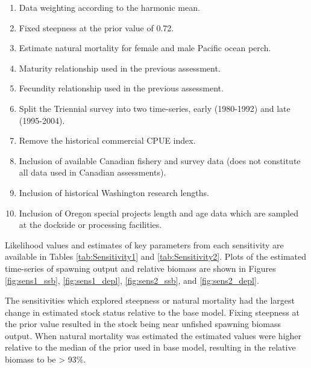 \documentclass[12pt,]{article}
\begin{document}
\begin{enumerate}

  \item Data weighting according to the harmonic mean.
  
  \item Fixed steepness at the prior value of 0.72.
  
  \item Estimate natural mortality for female and male Pacific ocean perch.
  
  \item Maturity relationship used in the previous assessment.
  
  \item Fecundity relationship used in the previous assessment.
  
  \item Split the Triennial survey into two time-series, early (1980-1992) and late (1995-2004).
  
  \item Remove the historical commercial CPUE index.
  
  \item Inclusion of available Canadian fishery and survey data (does not constitute all data used in Canadian assessments).
  
  \item Inclusion of historical Washington research lengths.  
  
  \item Inclusion of Oregon special projects length and age data which are sampled at the dockside or processing facilities.  
  
\end{enumerate}

Likelihood values and estimates of key parameters from each sensitivity
are available in Tables \ref{tab:Sensitivity1} and
\ref{tab:Sensitivity2}. Plots of the estimated time-series of spawning
output and relative biomass are shown in Figures \ref{fig:sens1_ssb},
\ref{fig:sens1_depl}, \ref{fig:sens2_ssb}, and \ref{fig:sens2_depl}.

The sensitivities which explored steepness or natural mortality had the
largest change in estimated stock status relative to the base model.
Fixing steepness at the prior value resulted in the stock being near
unfished spawning biomass output. When natural mortality was estimated
the estimated values were higher relative to the median of the prior
used in base model, resulting in the relative biomass to be
\textgreater{} 93\%.
\end{document}
